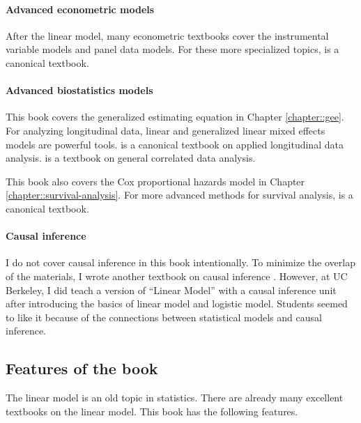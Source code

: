 \paragraph*{Advanced econometric models}
After the linear model, many econometric textbooks cover the instrumental variable models and panel data models. For these more specialized topics, \citet{wooldridge2010econometric} is a canonical textbook. 




\paragraph*{Advanced biostatistics models}
This book covers the generalized estimating equation in Chapter \ref{chapter::gee}. For analyzing longitudinal data, linear and generalized linear mixed effects models are powerful tools. \citet{fitzmaurice2012applied} is a canonical textbook on applied longitudinal data analysis.  
\citet{peter2007correlated} is a textbook on general correlated data analysis.


This book also covers the Cox proportional hazards model in Chapter \ref{chapter::survival-analysis}. For more advanced methods for survival analysis, \citet{kalbfleisch2011statistical} is a canonical textbook. 



\paragraph*{Causal inference}
I do not cover causal inference in this book intentionally. To minimize the overlap of the materials, I wrote another textbook on causal inference \citep{ding2023first}. However,  at UC Berkeley, I did teach a version of ``Linear Model'' with a causal inference unit after introducing the basics of linear model and logistic model. Students seemed to like it because of the connections between statistical models and causal inference. 



 

\subsection*{Features of the book}

 
The linear model is an old topic in statistics. There are already many excellent textbooks on the linear model. This book has the following features.


